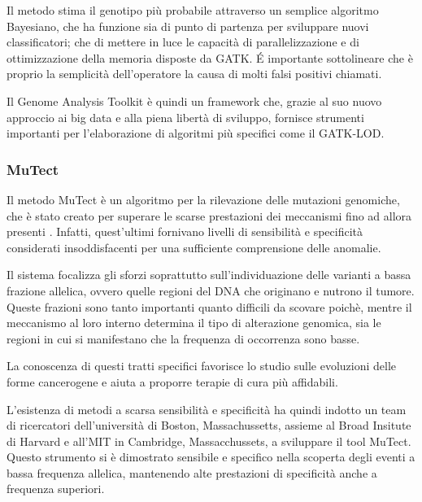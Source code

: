 Il metodo stima il genotipo più probabile attraverso un semplice algoritmo Bayesiano, che ha funzione sia di punto di partenza per sviluppare nuovi classificatori; che di mettere in luce le capacità di parallelizzazione e di ottimizzazione della memoria disposte da GATK.
\'E importante sottolineare che è proprio la semplicità dell'operatore la causa di molti falsi positivi chiamati.

Il Genome Analysis Toolkit è quindi un framework che, grazie al suo nuovo approccio ai big data e alla piena libertà di sviluppo, fornisce strumenti importanti per l'elaborazione di algoritmi più specifici come il GATK-LOD.

\subsubsection{MuTect}
Il metodo MuTect è un algoritmo per la rilevazione delle mutazioni genomiche, che è stato creato per superare le scarse prestazioni dei meccanismi fino ad allora presenti \cite{Cibulskis2013}.
Infatti, quest'ultimi fornivano livelli di sensibilità e specificità considerati insoddisfacenti per una sufficiente comprensione delle anomalie.

Il sistema focalizza gli sforzi soprattutto sull'individuazione delle varianti a bassa frazione allelica, ovvero quelle regioni del DNA che originano e nutrono il tumore.
Queste frazioni sono tanto importanti quanto difficili da scovare poichè, mentre il meccanismo al loro interno determina il tipo di alterazione genomica, sia le regioni in cui si manifestano che la frequenza di occorrenza sono basse.

La conoscenza di questi tratti specifici favorisce lo studio sulle evoluzioni delle forme cancerogene e aiuta a proporre terapie di cura più affidabili.

L'esistenza di metodi a scarsa sensibilità e specificità ha quindi indotto un team di ricercatori dell'università di Boston, Massachussetts, assieme al Broad Insitute di Harvard e all'MIT in Cambridge, Massacchussets, a sviluppare il tool MuTect.
Questo strumento si è dimostrato sensibile e specifico nella scoperta degli eventi a bassa frequenza allelica, mantenendo alte prestazioni di specificità anche a frequenza superiori.

